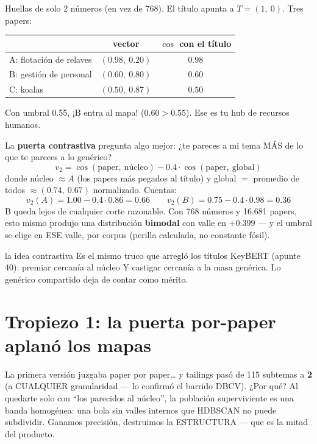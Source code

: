 \documentclass[11pt,a4paper]{article}
\begin{document}
Huellas de solo 2 números (en vez de 768). El título apunta a $T=(1,\ 0)$. Tres papers:

\begin{center}
\begin{tabular}{lcc}
 & vector & $\cos$ con el título \\
\hline
A: flotación de relaves & $(0.98,\ 0.20)$ & $0.98$ \\
B: gestión de personal  & $(0.60,\ 0.80)$ & $0.60$ \\
C: koalas               & $(0.50,\ 0.87)$ & $0.50$ \\
\end{tabular}
\end{center}

Con umbral 0.55, ¡B entra al mapa! ($0.60 > 0.55$). Ese es tu hub de recursos humanos.

La \textbf{puerta contrastiva} pregunta algo mejor: ¿te pareces a mi tema MÁS de lo que
te pareces a lo genérico?
\[
v_2 = \cos(\mbox{paper},\ \mbox{núcleo}) - 0.4 \cdot \cos(\mbox{paper},\ \mbox{global})
\]
donde núcleo $\approx A$ (los papers más pegados al título) y global $=$ promedio de
todos $\approx (0.74,\ 0.67)$ normalizado. Cuentas:
\[
v_2(A) = 1.00 - 0.4 \cdot 0.86 = \mathbf{0.66}
\qquad
v_2(B) = 0.75 - 0.4 \cdot 0.98 = \mathbf{0.36}
\]
B queda lejos de cualquier corte razonable. Con 768 números y 16.681 papers, esto mismo
produjo una distribución \textbf{bimodal} con valle en $+0.399$ --- y el umbral se elige
en ESE valle, por corpus (perilla calculada, no constante fósil).

\begin{concepto}{la idea contrastiva}
Es el mismo truco que arregló los títulos KeyBERT (apunte 40): premiar cercanía al
núcleo Y castigar cercanía a la masa genérica. Lo genérico compartido deja de contar
como mérito.
\end{concepto}

\section{Tropiezo 1: la puerta por-paper aplanó los mapas}

La primera versión juzgaba paper por paper\ldots{} y tailings pasó de 115 subtemas a
\textbf{2} (a CUALQUIER granularidad --- lo confirmó el barrido DBCV). ¿Por qué? Al
quedarte solo con ``los parecidos al núcleo'', la población superviviente es una banda
homogénea: una bola sin valles internos que HDBSCAN no puede subdividir. Ganamos
precisión, destruimos la ESTRUCTURA --- que es la mitad del producto.
\end{document}
